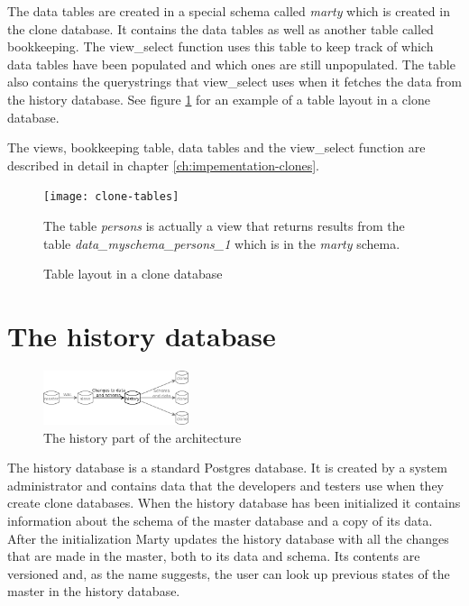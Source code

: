 The data tables are created in a special schema called \textit{marty} which is created in the clone database.
It contains the data tables as well as another table called bookkeeping.
The view\_select function uses this table to keep track of which data tables have been populated and which ones are still unpopulated.
The table also contains the querystrings that view\_select uses when it fetches the data from the history database.
See figure \ref{fig:clone-tables} for an example of a table layout in a clone database.

The views, bookkeeping table, data tables and the view\_select function are described in detail in chapter \ref{ch:impementation-clones}.

\begin{figure}[h!]
  \centering
    \texttt{[image: clone-tables]}
  \caption{Table layout in a clone database}
  \medskip
  \small
  The table \textit{persons} is actually a view that returns results from the table \textit{data\_myschema\_persons\_1} which is in the \textit{marty} schema.
  \label{fig:clone-tables}
\end{figure}

\section{The history database}
\label{ch:architecture-history-databases}

\begin{figure}
  \vspace{-20pt}
  \begin{center}
    \includegraphics[width=0.38\textwidth]{img/architecture-history}
  \end{center}
  \vspace{-20pt}
  \caption{The history part of the architecture}
  \vspace{-10pt}
\end{figure}

The history database is a standard Postgres database.
It is created by a system administrator and contains data that the developers and testers use when they create clone databases.
When the history database has been initialized it contains information about the schema of the master database and a copy of its data.
After the initialization Marty updates the history database with all the changes that are made in the master, both to its data and schema.
Its contents are versioned and, as the name suggests, the user can look up previous states of the master in the history database.


